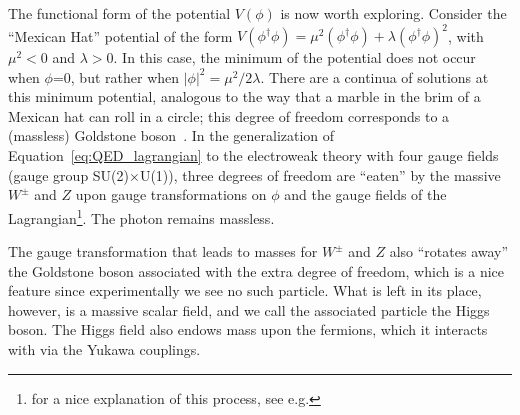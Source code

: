 
The functional form of the potential $V(\phi)$ is now worth exploring.
Consider the ``Mexican Hat'' potential of the form $V(\phi^{\dagger}\phi)=\mu^2(\phi^\dagger\phi)+\lambda(\phi^\dagger\phi)^2$, with $\mu^2<$0 and $\lambda>$0. In this case, the minimum of the potential
does not occur when $\phi$=0, but rather when $|\phi|^2=\mu^2/2\lambda$.
There are a continua of solutions at this minimum potential, analogous to 
the way that a marble in the brim of a Mexican hat can roll in a circle;
this degree of freedom corresponds to a (massless) Goldstone boson~\cite{broken_symmetries}.
In the generalization of Equation~\ref{eq:QED_lagrangian} to the electroweak
theory with four gauge fields (gauge group SU(2)$\times$U(1)), three degrees of freedom
are ``eaten'' by the massive $W^\pm$ and $Z$ upon gauge transformations on $\phi$ 
and the gauge fields of the Lagrangian\cite{glashow}\footnote{for a nice explanation of this
process, see e.g.\cite{ellis}}.  The photon remains massless.

The gauge transformation that leads to masses for $W^\pm$ and $Z$ also ``rotates
away'' the Goldstone boson associated with the extra degree of freedom, which
is a nice feature since experimentally we see no such particle.  What is left
in its place, however, is a massive scalar field, and we call the associated
particle the Higgs boson.  The Higgs field also endows mass upon the fermions,
which it interacts with via the Yukawa couplings.



